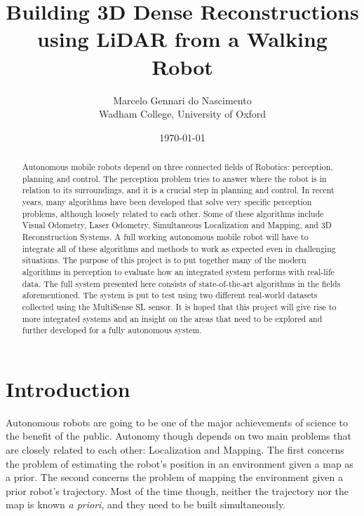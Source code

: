 \documentclass[12pt]{article}
\title{Building 3D Dense Reconstructions using LiDAR from a Walking Robot}
\author{Marcelo Gennari do Nascimento \\ Wadham College, University of Oxford}
\date{\today}
\begin{document}

	\maketitle

	\newpage

	\begin{abstract}
		Autonomous mobile robots depend on three connected fields of Robotics: perception, planning and control. The perception problem tries to answer where the robot is in relation to its surroundings, and it is a crucial step in planning and control.
		In recent years, many algorithms have been developed that solve very specific perception problems, although loosely related to each other. Some of these algorithms include Visual Odometry, Laser Odometry, Simultaneous Localization and Mapping, and 3D Reconstruction Systems.
		A full working autonomous mobile robot will have to integrate all of these algorithms and methods to work as expected even in challenging situations.
		The purpose of this project is to put together many of the modern algorithms in perception to evaluate how an integrated system performs with real-life data. The full system presented here consists of state-of-the-art algorithms in the fields aforementioned. The system is put to test using two different real-world datasets collected using the MultiSense SL sensor.
		It is hoped that this project will give rise to more integrated systems and an insight on the areas that need to be explored and further developed for a fully autonomous system.
	\end{abstract}

	\newpage
	\tableofcontents

	\newpage

	\section{Introduction}

Autonomous robots are going to be one of the major achievements of science to the benefit of the public. Autonomy though depends on two main problems that are closely related to each other: Localization and Mapping. The first concerns the problem of estimating the robot's position in an environment given a map as a prior. The second concerns the problem of mapping the environment given a prior robot's trajectory. Most of the time though, neither the trajectory nor the map is known \textit{a priori}, and they need to be built simultaneously. 
\end{document}
